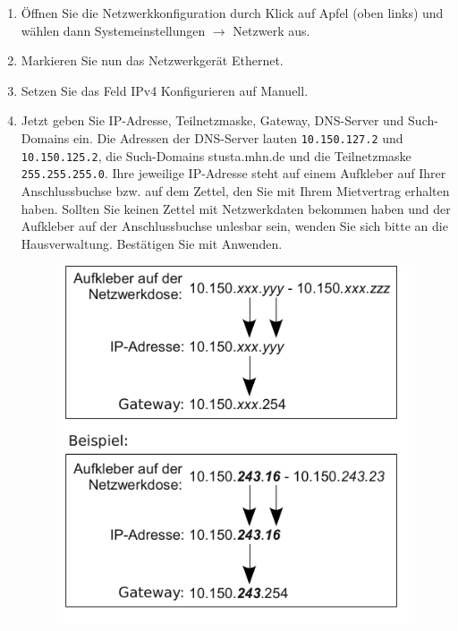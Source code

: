 \documentclass[a4paper,12pt]{scrartcl}
\begin{document}
\begin{enumerate}
    \item Öffnen Sie die Netzwerkkonfiguration durch Klick auf Apfel (oben links) und wählen dann Systemeinstellungen $\rightarrow$ Netzwerk aus.
    \item Markieren Sie nun das Netzwerkgerät Ethernet.
    \item Setzen Sie das Feld IPv4 Konfigurieren auf Manuell.
    \item Jetzt geben Sie IP-Adresse, Teilnetzmaske, Gateway, DNS-Server und Such-Domains ein. Die Adressen der DNS-Server lauten \nolinkurl{10.150.127.2} und \nolinkurl{10.150.125.2}, die Such-Domains stusta.mhn.de und die Teilnetzmaske \nolinkurl{255.255.255.0}. Ihre jeweilige IP-Adresse steht auf einem Aufkleber auf Ihrer Anschlussbuchse bzw. auf dem Zettel, den Sie mit Ihrem Mietvertrag erhalten haben. Sollten Sie keinen Zettel mit Netzwerkdaten bekommen haben und der Aufkleber auf der Anschlussbuchse unlesbar sein, wenden Sie sich bitte an die Hausverwaltung. Bestätigen Sie mit Anwenden.
      \begin{figure}[h!]
      \centering
        \begin{minipage}[c]{0.38\linewidth}
          \centering
          \includegraphics[width=\linewidth,keepaspectratio]{Bilder/IP_Gerneric}

\end{minipage}
\end{figure}
\end{enumerate}
\end{document}
